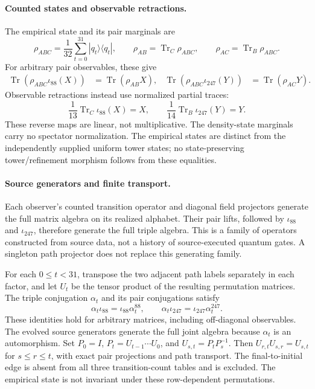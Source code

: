 \paragraph{Counted states and observable retractions.}
The empirical state and its pair marginals are
\[
 \rho_{ABC}=\frac1{32}\sum_{t=0}^{31}|q_t\rangle\langle q_t|,
 \qquad \rho_{AB}=\operatorname{Tr}_C\rho_{ABC},\qquad
 \rho_{AC}=\operatorname{Tr}_B\rho_{ABC}.
\]
For arbitrary pair observables, these give
\begin{align*}
 \operatorname{Tr}(\rho_{ABC}\iota_{88}(X))
   &=\operatorname{Tr}(\rho_{AB}X),&
 \operatorname{Tr}(\rho_{ABC}\iota_{247}(Y))
   &=\operatorname{Tr}(\rho_{AC}Y).
\end{align*}
Observable retractions instead use normalized partial traces:
\[
 \frac1{13}\operatorname{Tr}_C\iota_{88}(X)=X,
 \qquad \frac1{14}\operatorname{Tr}_B\iota_{247}(Y)=Y.
\]
These reverse maps are linear, not multiplicative. The density-state
marginals carry no spectator normalization. The empirical states are
distinct from the independently supplied uniform tower states; no
state-preserving tower/refinement morphism follows from these equalities.

\paragraph{Source generators and finite transport.}
Each observer's counted transition operator and diagonal field projectors
generate the full matrix algebra on its realized alphabet. Their pair lifts,
followed by \(\iota_{88}\) and \(\iota_{247}\), therefore generate the
full triple algebra. This is a family of operators constructed from source
data, not a history of source-executed quantum gates. A singleton path
projector does not replace this generating family.

For each \(0\leq t<31\), transpose the two adjacent path labels separately
in each factor, and let \(U_t\) be the tensor product of the resulting
permutation matrices. The triple conjugation \(\alpha_t\) and its pair
conjugations satisfy
\[
 \alpha_t\iota_{88}=\iota_{88}\alpha^{88}_t,
 \qquad \alpha_t\iota_{247}=\iota_{247}\alpha^{247}_t.
\]
These identities hold for arbitrary matrices, including off-diagonal
observables. The evolved source generators generate the full joint algebra
because \(\alpha_t\) is an automorphism. Set
\(P_0=I\), \(P_t=U_{t-1}\cdots U_0\), and
\(U_{s,t}=P_tP_s^{-1}\). Then
\(U_{r,t}U_{s,r}=U_{s,t}\) for \(s\leq r\leq t\), with exact pair
projections and path transport. The final-to-initial edge is absent from
all three transition-count tables and is excluded. The empirical state is
not invariant under these row-dependent permutations.

